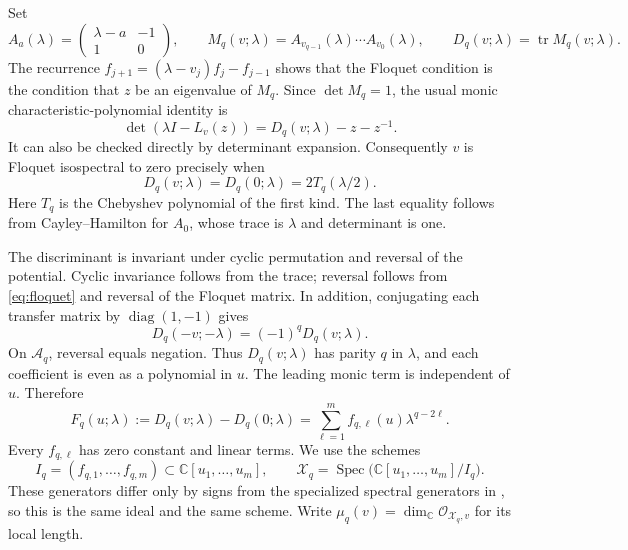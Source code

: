 \documentclass[11pt,a4paper]{article}
\theoremstyle{definition}
\theoremstyle{remark}
\newcommand{\C}{\mathbb C}
\newcommand{\A}{\mathcal A}
\newcommand{\X}{\mathcal X}
\newcommand{\tr}{\operatorname{tr}}
\newcommand{\Spec}{\operatorname{Spec}}
\DeclareMathOperator{\diag}{diag}
\begin{document}
Set
\begin{equation}\label{eq:transfer}
 A_a(\lambda)=\begin{pmatrix}\lambda-a&-1\\1&0\end{pmatrix},\qquad
 M_q(v;\lambda)=A_{v_{q-1}}(\lambda)\cdots A_{v_0}(\lambda),\qquad
 D_q(v;\lambda)=\tr M_q(v;\lambda).
\end{equation}
The recurrence $f_{j+1}=(\lambda-v_j)f_j-f_{j-1}$ shows that the Floquet
condition is the condition that $z$ be an eigenvalue of $M_q$. Since
$\det M_q=1$, the usual monic characteristic-polynomial identity is
\begin{equation}\label{eq:floquet}
 \det(\lambda I-L_v(z))=D_q(v;\lambda)-z-z^{-1}.
\end{equation}
It can also be checked directly by determinant expansion. Consequently
$v$ is Floquet isospectral to zero precisely when
\begin{equation}\label{eq:zeroiso}
 D_q(v;\lambda)=D_q(0;\lambda)=2T_q(\lambda/2).
\end{equation}
Here $T_q$ is the Chebyshev polynomial of the first kind. The last equality
follows from Cayley--Hamilton for $A_0$, whose trace is $\lambda$ and determinant
is one.

The discriminant is invariant under cyclic permutation and reversal of the
potential. Cyclic invariance follows from the trace; reversal follows from
\eqref{eq:floquet} and reversal of the Floquet matrix. In addition, conjugating
each transfer matrix by $\diag(1,-1)$ gives
\[
 D_q(-v;-\lambda)=(-1)^qD_q(v;\lambda).
\]
On $\A_q$, reversal equals negation. Thus $D_q(v;\lambda)$ has parity $q$
in $\lambda$, and each coefficient is even as a polynomial in $u$.
The leading monic term is independent of $u$. Therefore
\begin{equation}\label{eq:coeffs}
 F_q(u;\lambda):=D_q(v;\lambda)-D_q(0;\lambda)
     =\sum_{\ell=1}^m f_{q,\ell}(u)\lambda^{q-2\ell}.
\end{equation}
Every $f_{q,\ell}$ has zero constant and linear terms. We use the schemes
\begin{equation}\label{eq:scheme}
 I_q=(f_{q,1},\ldots,f_{q,m})\subset\C[u_1,\ldots,u_m],\qquad
 \X_q=\Spec\bigl(\C[u_1,\ldots,u_m]/I_q\bigr).
\end{equation}
These generators differ only by signs from the specialized spectral
generators in \cite{FFORS}, so this is the same ideal and the same scheme.
Write $\mu_q(v)=\dim_\C\mathcal O_{\X_q,v}$ for its local length.
\end{document}
